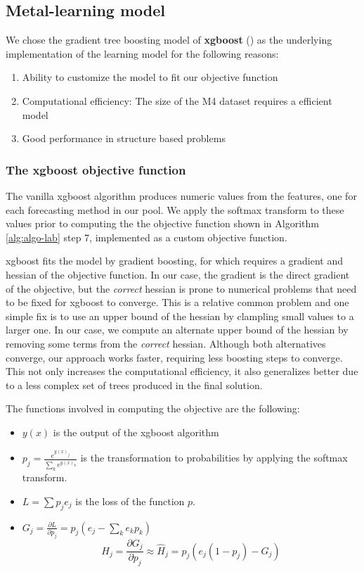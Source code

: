 \documentclass[11pt,a4paper,]{article}
\providecommand{\tightlist}{%
  \setlength{\itemsep}{0pt}\setlength{\parskip}{0pt}}
\theoremstyle{definition}
\theoremstyle{definition}
\theoremstyle{definition}
\theoremstyle{remark}
\begin{document}
\subsection{Metal-learning model}\label{metal-learning-model}

We chose the gradient tree boosting model of \textbf{xgboost}
(\textcite{chen2016xgboost}) as the underlying implementation of the
learning model for the following reasons:

\begin{enumerate}
\def\labelenumi{\arabic{enumi}.}
\tightlist
\item
  Ability to customize the model to fit our objective function
\item
  Computational efficiency: The size of the M4 dataset requires a
  efficient model
\item
  Good performance in structure based problems
\end{enumerate}

\subsubsection{The xgboost objective
function}\label{the-xgboost-objective-function}

The vanilla xgboost algorithm produces numeric values from the features,
one for each forecasting method in our pool. We apply the softmax
transform to these values prior to computing the the objective function
shown in Algorithm \ref{alg:algo-lab} step 7, implemented as a custom
objective function.

xgboost fits the model by gradient boosting, for which requires a
gradient and hessian of the objective function. In our case, the
gradient is the direct gradient of the objective, but the \emph{correct}
hessian is prone to numerical problems that need to be fixed for xgboost
to converge. This is a relative common problem and one simple fix is to
use an upper bound of the hessian by clampling small values to a larger
one. In our case, we compute an alternate upper bound of the hessian by
removing some terms from the \emph{correct} hessian. Although both
alternatives converge, our approach works faster, requiring less
boosting steps to converge. This not only increases the computational
efficiency, it also generalizes better due to a less complex set of
trees produced in the final solution.

The functions involved in computing the objective are the following:

\begin{itemize}
\tightlist
\item
  \(y(x)\) is the output of the xgboost algorithm
\item
  \(p_j = \frac{e^{y(x)_j}}{ \sum_k e^{y(x)_k}}\) is the transformation
  to probabilities by applying the softmax transform.
\item
  \(L = \sum p_j e_j\) is the loss of the function \(p\).
\item
  \(G_j = \frac{\partial{L}}{\partial{p_j}} = p_j(e_j -\sum_k e_kp_k)\)
  \[ H_j = \frac{\partial{G_j}}{\partial{p_j}} \approx \hat{H}_j = p_j(e_j(1-p_j) - G_j)  \]
\end{itemize}
\end{document}
